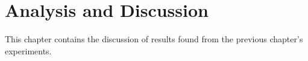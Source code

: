 \chapter{Analysis and Discussion}

This chapter contains the discussion of results found from the previous chapter's experiments.




